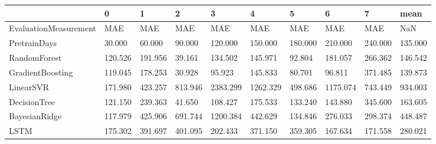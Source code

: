 \begin{tabular}{llllllllll}
\toprule
{} &       0 &       1 &       2 &        3 &        4 &       5 &        6 &       7 &    mean \\
\midrule
EvaluationMeasurement &     MAE &     MAE &     MAE &      MAE &      MAE &     MAE &      MAE &     MAE &     NaN \\
PretrainDays          &  30.000 &  60.000 &  90.000 &  120.000 &  150.000 & 180.000 &  210.000 & 240.000 & 135.000 \\
RandomForest          & 120.526 & 191.956 &  39.161 &  134.502 &  145.971 &  92.804 &  181.057 & 266.362 & 146.542 \\
GradientBoosting      & 119.045 & 178.253 &  30.928 &   95.923 &  145.833 &  80.701 &   96.811 & 371.485 & 139.873 \\
LinearSVR             & 171.980 & 423.257 & 813.946 & 2383.299 & 1262.329 & 498.686 & 1175.074 & 743.449 & 934.003 \\
DecisionTree          & 121.150 & 239.363 &  41.650 &  108.427 &  175.533 & 133.240 &  143.880 & 345.600 & 163.605 \\
BayesianRidge         & 117.979 & 425.906 & 691.744 & 1200.384 &  442.629 & 134.846 &  276.033 & 298.374 & 448.487 \\
LSTM                  & 175.302 & 391.697 & 401.095 &  202.433 &  371.150 & 359.305 &  167.634 & 171.558 & 280.021 \\
\bottomrule
\end{tabular}
